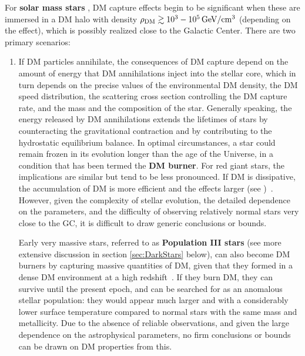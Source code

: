 For {\bf solar mass stars} \cite{DMinSunlikeStars}, 
DM capture effects begin to be significant when 
these are immersed in a DM halo with density $\rho_{\rm DM} \gtrsim 10^3 - 10^5 \, {\rm GeV}/{\rm cm}^3$ (depending on the effect), which is possibly realized
close to the Galactic Center. There are two 
primary scenarios:
\begin{enumerate}
 \item If DM particles annihilate, the consequences of DM capture depend on
 the amount of energy that DM annihilations inject into the stellar core, which in turn depends on the precise values of the environmental DM density, the DM speed distribution, the scattering cross section controlling the DM capture rate, and the mass and the composition of the star. 
Generally speaking, the energy released by DM annihilations extends the lifetimes of stars
by counteracting the gravitational contraction and by contributing to the hydrostatic equilibrium balance. In optimal circumstances, a star could remain frozen in its evolution longer than 
the age of the Universe, in a condition that has been termed the {\bf DM burner}. 
For red giant stars, the implications are similar but tend to be less pronounced.
If DM is dissipative, the accumulation of DM is more efficient and the effects larger (see )~\cite{DMinSunlikeStars}.
However, given the complexity of stellar evolution, the detailed dependence on the parameters, and the difficulty of observing relatively normal stars very close to the GC, it is difficult to draw generic conclusions or bounds.


Early very massive stars, referred to as {\bf Population III stars} (see more extensive discussion in section \ref{sec:DarkStars} below), can also
become DM burners by capturing massive quantities of DM, 
given that they formed in a dense DM environment at a high redshift~\cite{DMinPopIIIStars}. If they burn DM, they can survive until the present epoch, and can be searched for as an anomalous stellar population: they would appear much larger and with a considerably lower surface temperature compared to normal stars with the same mass and metallicity. 
Due to the absence of reliable observations, and given the large dependence on the astrophysical parameters, no firm conclusions or bounds can be drawn on DM properties from this.  



\end{enumerate}
